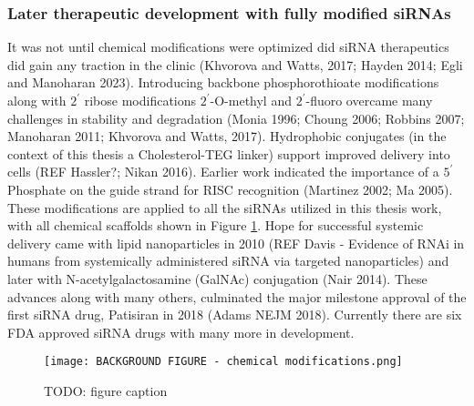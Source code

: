 \documentclass{report}
\begin{document}


\subsubsection{Later therapeutic development with fully modified siRNAs}
It was not until chemical modifications were optimized did siRNA therapeutics did gain any traction in the clinic (Khvorova and Watts, 2017; Hayden 2014; Egli and Manoharan 2023). Introducing backbone phosphorothioate modifications along with $2^\prime$ ribose modifications $2^\prime$-O-methyl and $2^\prime$-fluoro overcame many challenges in stability and degradation (Monia 1996; Choung 2006; Robbins 2007; Manoharan 2011; Khvorova and Watts, 2017). Hydrophobic conjugates (in the context of this thesis a Cholesterol-TEG linker) support improved delivery into cells (REF Hassler?; Nikan 2016). Earlier work indicated the importance of a $5^\prime$ Phosphate on the guide strand for RISC recognition (Martinez 2002; Ma 2005). These modifications are applied to all the siRNAs utilized in this thesis work, with all chemical scaffolds shown in Figure \ref{fig:Figure+ chemical modification patterns}. Hope for successful systemic delivery came with lipid nanoparticles in 2010 (REF Davis - Evidence of RNAi in humans from systemically administered siRNA via targeted nanoparticles) and later with N-acetylgalactosamine (GalNAc) conjugation (Nair 2014). These advances along with many others, culminated the major milestone approval of the first siRNA drug, Patisiran in 2018 (Adams NEJM 2018). Currently there are six FDA approved siRNA drugs with many more in development. 



\begin{figure}
    \centering
    \texttt{[image: BACKGROUND FIGURE - chemical modifications.png]}
    \caption[TODO: shorter figure title]{TODO: figure caption}
    \label{fig:Figure+ chemical modification patterns}
\end{figure}
\end{document}
